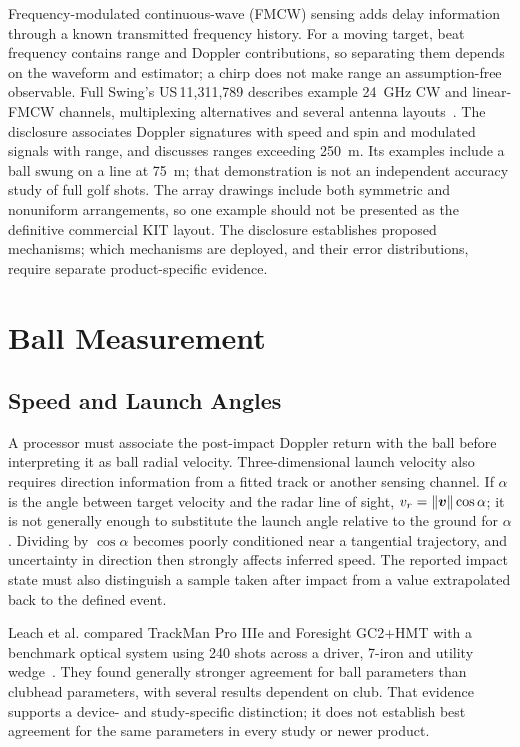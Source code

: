 Frequency-modulated continuous-wave (FMCW) sensing adds delay information through a known transmitted frequency history.
For a moving target, beat frequency contains range and Doppler contributions, so separating them depends on the waveform and estimator; a chirp does not make range an assumption-free observable.
Full Swing's US\,11,311,789 describes example \SI{24}{\giga\hertz} CW and linear-FMCW channels, multiplexing alternatives and several antenna layouts~\cite{fullswingpatent}.
The disclosure associates Doppler signatures with speed and spin and modulated signals with range, and discusses ranges exceeding \SI{250}{\meter}.
Its examples include a ball swung on a line at \SI{75}{\meter}; that demonstration is not an independent accuracy study of full golf shots.
The array drawings include both symmetric and nonuniform arrangements, so one example should not be presented as the definitive commercial KIT layout.
The disclosure establishes proposed mechanisms; which mechanisms are deployed, and their error distributions, require separate product-specific evidence.

\section{Ball Measurement}

\subsection{Speed and Launch Angles}

A processor must associate the post-impact Doppler return with the ball before interpreting it as ball radial velocity.
Three-dimensional launch velocity also requires direction information from a fitted track or another sensing channel.
If $\alpha$ is the angle between target velocity and the radar line of sight, $v_r=\lVert\bm{v}\rVert\cos\alpha$; it is not generally enough to substitute the launch angle relative to the ground for $\alpha$.
Dividing by $\cos\alpha$ becomes poorly conditioned near a tangential trajectory, and uncertainty in direction then strongly affects inferred speed.
The reported impact state must also distinguish a sample taken after impact from a value extrapolated back to the defined event.

Leach et al. compared TrackMan Pro IIIe and Foresight GC2+HMT with a benchmark optical system using 240 shots across a driver, 7-iron and utility wedge~\cite{leach2017}.
They found generally stronger agreement for ball parameters than clubhead parameters, with several results dependent on club.
That evidence supports a device- and study-specific distinction; it does not establish best agreement for the same parameters in every study or newer product.

